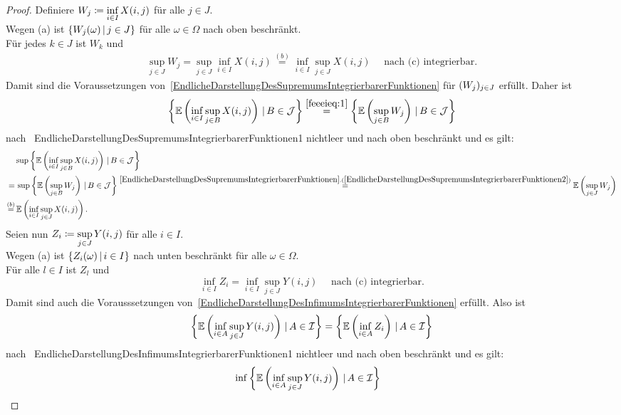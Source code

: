 \begin{proof}
Definiere $W_j \coloneqq  \underset{i\in I}\inf\, X(i, j)$ für alle $j \in J$.\\
Wegen (a) ist $\left\{W_j(\omega)\,|\,j\in J\right\}$ für alle $\omega \in \Omega$ nach
oben beschränkt.\\
Für jedes $k\in J$ ist $W_k$ und
\begin{align}
\sup_{j \in J}W_j = \sup_{j \in J}\inf_{i \in I}X(i, j) \overset{(b)}= 
\inf_{i \in I}\sup_{j \in J}X(i, j)\quad \text{ nach (c) integrierbar.}
\label{feeeieq:1}
\end{align}
Damit sind die Voraussetzungen von~\ref{EndlicheDarstellungDesSupremumsIntegrierbarerFunktionen} für
$(W_{j})_{j \in J}$ erfüllt. Daher ist
\[\left\{\mathbb{E}\left(\inf_{i\in I}\sup_{j \in B}X(i,j) \right)\,|\,B \in \mathcal{J}\right\}
\overset{\eqref{feeeieq:1}}= 
 \left\{\mathbb{E}\left(\sup_{j \in B}W_j \right)\,|\,B \in \mathcal{J}\right\}\]
nach~
{EndlicheDarstellungDesSupremumsIntegrierbarerFunktionen1} nichtleer und nach
oben beschränkt und es gilt:
\begin{align}
& \sup\menge{\E\left(\inf_{i \in I}\sup_{j \in B}X(i, j) \right)}{B \in \mcj}
\notag\\
 =&\,  \sup\menge{\E\left(\sup_{j \in B}W_j \right)}{B \in \mcj}
 \overset{\refclaim{EndlicheDarstellungDesSupremumsIntegrierbarerFunktionen}
 {EndlicheDarstellungDesSupremumsIntegrierbarerFunktionen2}}=
\E\left(\sup_{j \in J}W_j \right)\notag\\ 
\overset{(b)}= &\,\E\left(\inf_{i\in I}\sup_{j\in J}X(i,j)\right)\text.
\label{feeeieq:2}
\end{align}
Seien nun $Z_i \coloneqq  \underset{j \in J}\sup\,Y(i, j)$ für alle $i \in I$.\\
Wegen (a) ist $\left\{Z_i(\omega)\,|\,i\in I\right\}$ nach unten beschränkt für alle
$\omega \in \Omega$.\\
Für alle $l\in I$ ist $Z_l$ und
\[\inf_{i \in I}Z_i = \inf_{i \in I}\sup_{j \in J}Y(i, j) \quad
\text{ nach (c) integrierbar.} \]
Damit sind auch die Vorausssetzungen von~\ref{EndlicheDarstellungDesInfimumsIntegrierbarerFunktionen} erfüllt. Also ist
\[\left\{\mathbb{E}\left(\inf_{i\in A}\sup_{j\in J}Y(i,j)\right)\,|\,A\in\mathcal{I}\right\}
  =\left\{\mathbb{E}\left(\inf_{i\in A}Z_i\right)\,|\,A\in\mathcal{I}\right\}\]
nach~
{EndlicheDarstellungDesInfimumsIntegrierbarerFunktionen1} nichtleer und nach
oben beschränkt und es gilt:
\begin{align}
& \inf\menge{\E\left(\inf_{i\in A}\sup_{j\in J}Y(i,j)\right)}{A\in\mci}

\end{align}
\end{proof}
